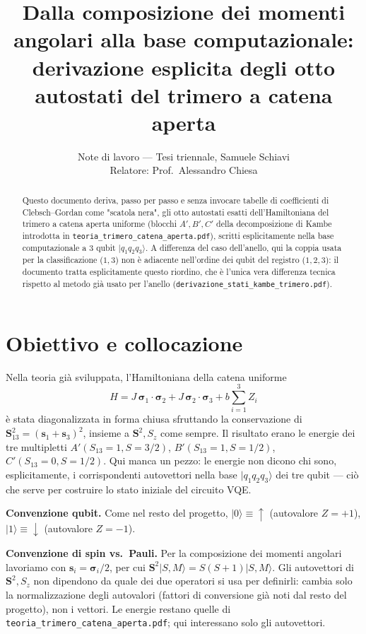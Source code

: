 \documentclass[11pt,a4paper]{article}
\title{Dalla composizione dei momenti angolari alla base computazionale:\\
derivazione esplicita degli otto autostati del trimero a catena aperta}
\author{Note di lavoro — Tesi triennale, Samuele Schiavi\\ Relatore: Prof.\ Alessandro Chiesa}
\date{}
\begin{document}
\maketitle

\begin{abstract}
\noindent
Questo documento deriva, passo per passo e senza invocare tabelle di
coefficienti di Clebsch–Gordan come "scatola nera", gli otto autostati
esatti dell'Hamiltoniana del trimero a catena aperta uniforme (blocchi
$A',B',C'$ della decomposizione di Kambe introdotta in
\texttt{teoria\_trimero\_catena\_aperta.pdf}), scritti esplicitamente nella
base computazionale a 3 qubit $|q_1q_2q_3\rangle$. A differenza del caso
dell'anello, qui la coppia usata per la classificazione ($1,3$) non è
adiacente nell'ordine dei qubit del registro ($1,2,3$): il documento tratta
esplicitamente questo riordino, che è l'unica vera differenza tecnica
rispetto al metodo già usato per l'anello
(\texttt{derivazione\_stati\_kambe\_trimero.pdf}).
\end{abstract}

\section{Obiettivo e collocazione}

Nella teoria già sviluppata, l'Hamiltoniana della catena uniforme
\begin{equation}
H = J\,\boldsymbol\sigma_1\cdot\boldsymbol\sigma_2 + J\,\boldsymbol\sigma_2\cdot\boldsymbol\sigma_3 + b\sum_{i=1}^{3}Z_i
\end{equation}
è stata diagonalizzata in forma chiusa sfruttando la conservazione di
$\mathbf S_{13}^2=(\mathbf s_1+\mathbf s_3)^2$, insieme a $\mathbf S^2,S_z$
come sempre. Il risultato erano le energie dei tre multipletti $A'(S_{13}=1,S=3/2)$,
$B'(S_{13}=1,S=1/2)$, $C'(S_{13}=0,S=1/2)$. Qui manca un pezzo: le energie
non dicono chi sono, esplicitamente, i corrispondenti autovettori nella base
$|q_1q_2q_3\rangle$ dei tre qubit — ciò che serve per costruire lo stato
iniziale del circuito VQE.

\textbf{Convenzione qubit.} Come nel resto del progetto, $|0\rangle\equiv{\uparrow}$
(autovalore $Z=+1$), $|1\rangle\equiv{\downarrow}$ (autovalore $Z=-1$).

\textbf{Convenzione di spin vs.\ Pauli.} Per la composizione dei momenti
angolari lavoriamo con $\mathbf s_i=\boldsymbol\sigma_i/2$, per cui
$\mathbf S^2|S,M\rangle=S(S+1)|S,M\rangle$. Gli autovettori di $\mathbf
S^2,S_z$ non dipendono da quale dei due operatori si usa per definirli:
cambia solo la normalizzazione degli autovalori (fattori di conversione già
noti dal resto del progetto), non i vettori. Le energie restano quelle di
\texttt{teoria\_trimero\_catena\_aperta.pdf}; qui interessano solo gli
autovettori.
\end{document}
